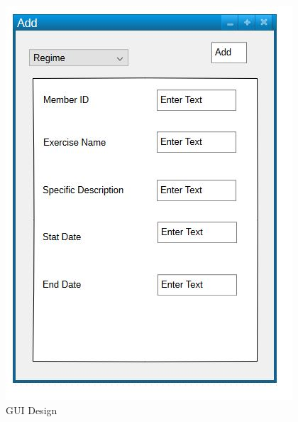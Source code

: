 \begin{figure}[H]
    \includegraphics[width=\textwidth]{Gui_5.JPG}
    \caption{GUI Design} \label{fig:GUI Designs}
\end{figure}

